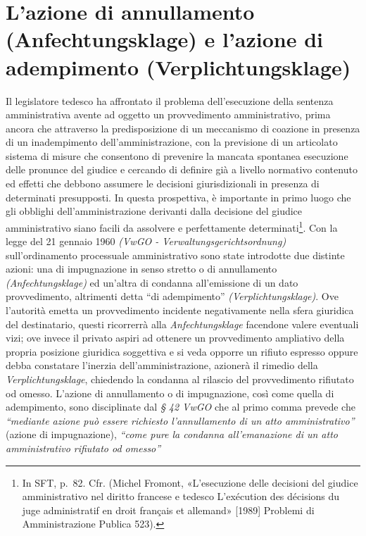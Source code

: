 \documentclass[12pt,it,a4paper,]{report}
\begin{document}
\hypertarget{lazione-di-annullamento-anfechtungsklage-e-lazione-di-adempimento-verplichtungsklage}{%
\section{L'azione di annullamento (Anfechtungsklage) e l'azione di
adempimento
(Verplichtungsklage)}\label{lazione-di-annullamento-anfechtungsklage-e-lazione-di-adempimento-verplichtungsklage}}

Il legislatore tedesco ha affrontato il problema dell'esecuzione della
sentenza amministrativa avente ad oggetto un provvedimento
amministrativo, prima ancora che attraverso la predisposizione di un
meccanismo di coazione in presenza di un inadempimento
dell'amministrazione, con la previsione di un articolato sistema di
misure che consentono di prevenire la mancata spontanea esecuzione delle
pronunce del giudice e cercando di definire già a livello normativo
contenuto ed effetti che debbono assumere le decisioni giurisdizionali
in presenza di determinati presupposti. In questa prospettiva, è
importante in primo luogo che gli obblighi dell'amministrazione
derivanti dalla decisione del giudice amministrativo siano facili da
assolvere e perfettamente determinati\footnote{In SFT, p.~82. Cfr.
  (Michel Fromont, {«L'esecuzione delle decisioni del giudice
  amministrativo nel diritto francese e tedesco L'exécution des
  décisions du juge administratif en droit français et allemand»}
  {[}1989{]} Problemi di Amministrazione Publica 523).}. Con la legge
del 21 gennaio 1960 \emph{(VwGO - Verwaltungsgerichtsordnung)}
sull'ordinamento processuale amministrativo sono state introdotte due
distinte azioni: una di impugnazione in senso stretto o di annullamento
\emph{(Anfechtungsklage)} ed un'altra di condanna all'emissione di un
dato provvedimento, altrimenti detta ``di adempimento''
\emph{(Verplichtungsklage)}. Ove l'autorità emetta un provvedimento
incidente negativamente nella sfera giuridica del destinatario, questi
ricorrerrà alla \emph{Anfechtungsklage} facendone valere eventuali vizi;
ove invece il privato aspiri ad ottenere un provvedimento ampliativo
della propria posizione giuridica soggettiva e si veda opporre un
rifiuto espresso oppure debba constatare l'inerzia dell'amministrazione,
azionerà il rimedio della \emph{Verplichtungsklage}, chiedendo la
condanna al rilascio del provvedimento rifiutato od omesso. L'azione di
annullamento o di impugnazione, così come quella di adempimento, sono
disciplinate dal \emph{§ 42 VwGO} che al primo comma prevede che
\emph{``mediante azione può essere richiesto l'annullamento di un atto
amministrativo''} (azione di impugnazione), \emph{``come pure la
condanna all'emanazione di un atto amministrativo rifiutato od omesso''}
\end{document}
